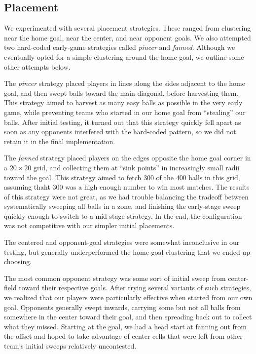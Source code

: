 \documentclass[
10pt, %
letterpaper, %
oneside, %
headinclude,footinclude, %
english
]{article}
\begin{document}
\subsection{Placement} 
We experimented with several placement strategies. These ranged from clustering near the home goal, near the center, and near opponent goals. We also attempted two hard-coded early-game strategies called \emph{pincer} and \emph{fanned}. Although we eventually opted for a simple clustering around the home goal, we outline some other attempts below.

The \emph{pincer} strategy placed players in lines along the sides adjacent to the home goal, and then swept balls toward the main diagonal, before harvesting them. This strategy aimed to harvest as many easy balls as possible in the very early game, while preventing teams who started in our home goal from ``stealing'' our balls. After initial testing, it turned out that this strategy quickly fell apart as soon as any opponents interfered with the hard-coded pattern, so we did not retain it in the final implementation. 

The \emph{fanned} strategy placed players on the edges opposite the home goal corner in a $20 \times 20$ grid, and collecting them at ``sink points'' in increasingly small radii toward the goal. This strategy aimed to fetch 300 of the 400 balls in this grid, assuming thaht 300 was a high enough number to win most matches. The results of this strategy were not great, as we had trouble balancing the tradeoff between systematically sweeping all balls in a zone, and finishing the early-stage sweep quickly enough to switch to a mid-stage strategy. In the end, the configuration was not competitive with our simpler initial placements.

The centered and opponent-goal strategies were somewhat inconclusive in our testing, but generally underperformed the home-goal clustering that we ended up choosing.

The most common opponent strategy was some sort of initial sweep from center-field toward their respective goals. After trying several variants of such strategies, we realized that our players were particularly effective when started from our own goal. Opponents generally swept inwards, carrying some but not all balls from somewhere in the center toward their goal, and then spreading back out to collect what they missed. Starting at the goal, we had a head start at fanning out from the offset and hoped to take advantage of center cells that were left from other team's initial sweeps relatively uncontested.
\end{document}
